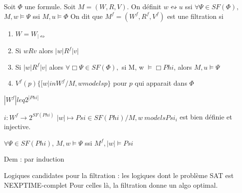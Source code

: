 \documentclass[10pt,a4paper]{article}
\begin{document}
\begin{definition}{}
 Soit $\Phi$ une formule. Soit $M = (W, R, V)$. On définit $w \leftrightsquigarrow u$ ssi $\forall \Psi \in SF(\Phi),$
$M, w \models \Psi$ ssi $M, u \models \Phi$
On dit que $M^f = (W^f, R^f, V^f)$ est une filtration si 
\begin{enumerate}
 \item $W = W_{| \leftrightsquigarrow}$
 \item Si $w R v$ alors $|w| R^f |v|$
 \item Si $|w| R^f |v|$ alors $\forall \Box \Psi \in SF(\Phi), $
	si M, w $\models \Box Phi$, alors $M,u \models \Psi$
\item $V^f(p) \{ [ w | in W^f / M,w models p \}$ pour $p$ qui apparait dans $\Phi$
\end{enumerate}

\end{definition}

\begin{prop}{}
$|W^f| leq 2^{|Phi|}$
\begin{dem}{}
 $i : W^f \rightarrow 2^{SF(Phi)}$
 $|w| \mapsto Psi \in SF(Phi) / M, w\ models Psi_i$
est bien définie et injective.
\end{dem}

\begin{thm}{}
 $\forall \Psi \in SF(Phi)$,
$M,w \models \Psi$ ssi $M^f , |w| \models Psi$
\end{thm}
Dem : par induction

Logiques candidates pour la filtration : 
les logiques dont le problème SAT est NEXPTIME-complet
Pour celles là, la filtration donne un algo optimal.
 
\end{prop}
\end{document}
